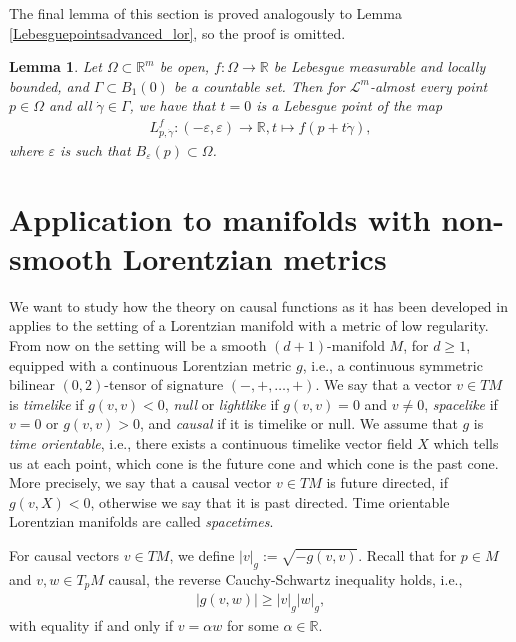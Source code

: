 \documentclass[a4paper,10pt]{article}
\newtheorem{lemma}[theorem]{Lemma}
\numberwithin{equation}{section}
\newcommand{\R}{\mathbb{R}}
\newcommand{\e}{\varepsilon}
\begin{document}
 The final lemma of this section is proved analogously to Lemma \ref{Lebesguepointsadvanced_lor}, so the proof is omitted. 

 \smallskip
 \begin{lemma}\label{lebesgue_point_line}
     Let $\Omega\subset \R^m$ be open, $f: \Omega \to \R$ be Lebesgue measurable and locally bounded, and $\Gamma \subset B_1(0)$ be a countable set. Then for $\mathcal{L}^m$-almost every point $p \in \Omega$ and all $\dot{\gamma} \in \Gamma$, we have that $t=0$ is a Lebesgue point of the map 
     \begin{align}
         L^f_{p, \dot{\gamma}}: (-\e,\e) \to \R, t \mapsto f(p+ t\dot{\gamma}), 
     \end{align}
     where $\e$ is such that $B_\e(p) \subset \Omega$.
 \end{lemma}

\section{Application to manifolds with non-smooth Lorentzian metrics}\label{sec4}
We want to study how the theory on causal functions as it has been developed in \cite{beran2024nonlinear} applies to the setting of a Lorentzian manifold with a metric of low regularity.
From now on the setting will be a smooth $(d+1)$-manifold $M$, for $d \geq 1$, equipped with a continuous Lorentzian metric $g$, i.e., a continuous symmetric bilinear $(0,2)$-tensor of signature $(-, +, \ldots, +)$.
We say that a vector $v \in TM$ is \emph{timelike} if $g(v,v) <0$, \emph{null} or \emph{lightlike} if $g(v,v)=0$ and $v \neq 0$, \emph{spacelike} if $v =0$ or $g(v,v)>0$, and \emph{causal} if it is timelike or null.
We assume that $g$ is \emph{time orientable}, i.e., there exists a continuous timelike vector field $X$ which tells us at each point, which cone is the future cone and which cone is the past cone. More precisely, we say that a causal vector $v \in TM$ is future directed, if $g(v, X)<0$, otherwise we say that it is past directed. Time orientable Lorentzian manifolds are called \emph{spacetimes}.

For causal vectors $v \in TM$, we define $|v|_g:= \sqrt{-g(v,v)}$. Recall that for $p \in M$ and $v, w \in T_pM$ causal, the reverse Cauchy-Schwartz inequality holds, i.e.,
\begin{align}\label{reverse_cauchy_schwartz}
    |g(v, w)| \geq |v|_g|w|_g,
\end{align}
with equality if and only if $v = \alpha w$ for some $\alpha \in \R$. 
\end{document}
